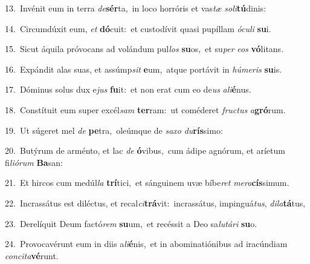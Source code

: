 {\numbfont\textcolor{\numbcolor}{13.}}~Invénit eum in terra \textit{de}\-\textbf{sér}ta,~\star in loco horróris et vas\textit{tæ} \textit{so}\-\textit{li}\textbf{tú}dinis:\par
{\numbfont\textcolor{\numbcolor}{14.}}~Circumdúxit eum, \textit{et} \textbf{dó}\-cuit:~\star et custodívit quasi pupíllam \textit{ó}\-\textit{cu}\textit{li} \textbf{su}\-i.\par
{\numbfont\textcolor{\numbcolor}{15.}}~Sicut áquila próvocans ad volándum pul\textit{los} \textbf{su}\-os,~\star et su\textit{per} \textit{e}\-\textit{os} \textbf{vó}\-litans.\par
{\numbfont\textcolor{\numbcolor}{16.}}~Expándit alas suas, et assúmp\textit{sit} \textbf{e}\-um,~\star atque portávit in \textit{hú}\-\textit{me}\textit{ris} \textbf{su}\-is.\par
{\numbfont\textcolor{\numbcolor}{17.}}~Dóminus solus dux e\textit{jus} \textbf{fu}\-it:~\star et non erat cum eo de\textit{us} \textit{a}\-\textit{li}\textbf{é}nus.\par
{\numbfont\textcolor{\numbcolor}{18.}}~Constítuit eum super excél\textit{sam} \textbf{ter}\-ram:~\star ut coméderet \textit{fruc}\-\textit{tus} \textit{a}\-\textbf{gró}rum.\par
{\numbfont\textcolor{\numbcolor}{19.}}~Ut súgeret mel \textit{de} \textbf{pe}\-tra,~\star oleúmque de \textit{sa}\-\textit{xo} \textit{du}\-\textbf{rís}simo:\par
{\numbfont\textcolor{\numbcolor}{20.}}~Butýrum de arménto, et lac \textit{de} \textbf{ó}\-vibus,~\star cum ádipe agnórum, et aríetum fi\-\textit{li}\-\textit{ó}\textit{rum} \textbf{Ba}\-san:\par
{\numbfont\textcolor{\numbcolor}{21.}}~Et hircos cum medúl\textit{la} \textbf{trí}\-tici,~\star et sánguinem uvæ bíbe\textit{ret} \textit{me}\-\textit{ra}\textbf{cís}simum.\par
{\numbfont\textcolor{\numbcolor}{22.}}~Incrassátus est diléctus, et recal\-\textit{ci}\-\textbf{trá}vit:~\star incrassátus, impinguá\-\textit{tus}\-, \textit{di}\-\textit{la}\textbf{tá}tus,\par
{\numbfont\textcolor{\numbcolor}{23.}}~Derelíquit Deum factó\textit{rem} \textbf{su}\-um,~\star et recéssit a Deo sa\-\textit{lu}\-\textit{tá}\textit{ri} \textbf{su}\-o.\par
{\numbfont\textcolor{\numbcolor}{24.}}~Provocavérunt eum in diis a\-\textit{li}\-\textbf{é}nis,~\star et in abominatiónibus ad iracúndiam \textit{con}\-\textit{ci}\textit{ta}\textbf{vé}runt.\par
